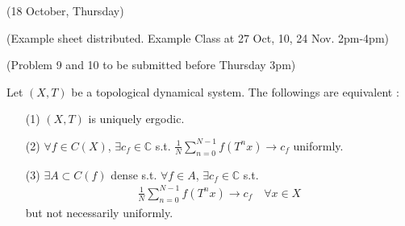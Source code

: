 \documentclass[12pt,a4paper]{report}
\begin{document}
\newday

(18 October, Thursday)
\s

(Example sheet distributed. Example Class at 27 Oct, 10, 24 Nov. 2pm-4pm)

(Problem 9 and 10 to be submitted before Thursday 3pm)
\s

\thm Let $(X,T)$ be a topological dynamical system. The followings are equivalent :
\begin{itemize}
\item[(1)] $(X,T)$ is uniquely ergodic.
\item[(2)] $\forall f \in C(X)$, $\exists c_f \in \mathbb{C}$ s.t. $\frac{1}{N}\sum_{n=0}^{N-1} f(T^n x) \rightarrow c_f$ uniformly.
\item[(3)] $\exists A \subset C(f)$ dense s.t. $\forall f\in A$, $\exists c_f \in \mathbb{C}$ s.t.
\begin{align*}
\frac{1}{N} \sum_{n=0}^{N-1} f(T^n x) \rightarrow c_f \quad \forall x \in X
\end{align*}
but not necessarily uniformly.
\end{itemize}
\end{document}
